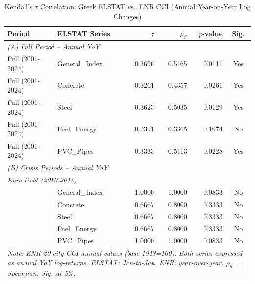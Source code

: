\begin{table}[htbp]
\centering
\caption{Kendall's $\tau$ Correlation: Greek ELSTAT vs.\ ENR CCI (Annual Year-on-Year Log Changes)}
\label{tab:enr_validation}
\begin{tabular}{llrrrc}
\toprule
Period & ELSTAT Series & $\tau$ & $\rho_S$ & $p$-value & Sig. \\
\midrule
\multicolumn{6}{l}{\textit{(A) Full Period -- Annual YoY}} \\
Full (2001-2024) & General_Index & 0.3696 & 0.5165 & 0.0111 & Yes \\
Full (2001-2024) & Concrete & 0.3261 & 0.4357 & 0.0261 & Yes \\
Full (2001-2024) & Steel & 0.3623 & 0.5035 & 0.0129 & Yes \\
Full (2001-2024) & Fuel_Energy & 0.2391 & 0.3365 & 0.1074 & No \\
Full (2001-2024) & PVC_Pipes & 0.3333 & 0.5113 & 0.0228 & Yes \\
\midrule
\multicolumn{6}{l}{\textit{(B) Crisis Periods -- Annual YoY}} \\
\multicolumn{6}{l}{\quad \textit{Euro Debt (2010-2013)}} \\
 & General_Index & 1.0000 & 1.0000 & 0.0833 & No \\ %
 & Concrete & 0.6667 & 0.8000 & 0.3333 & No \\ %
 & Steel & 0.6667 & 0.8000 & 0.3333 & No \\ %
 & Fuel_Energy & 0.6667 & 0.8000 & 0.3333 & No \\ %
 & PVC_Pipes & 1.0000 & 1.0000 & 0.0833 & No \\ %
\bottomrule
\multicolumn{6}{l}{\footnotesize \textit{Note: ENR 20-city CCI annual values (base 1913=100). Both series expressed as annual YoY log-returns. ELSTAT: Jan-to-Jan. ENR: year-over-year. $\rho_S$ = Spearman. Sig.\ at 5\%.}} \\
\end{tabular}
\end{table}